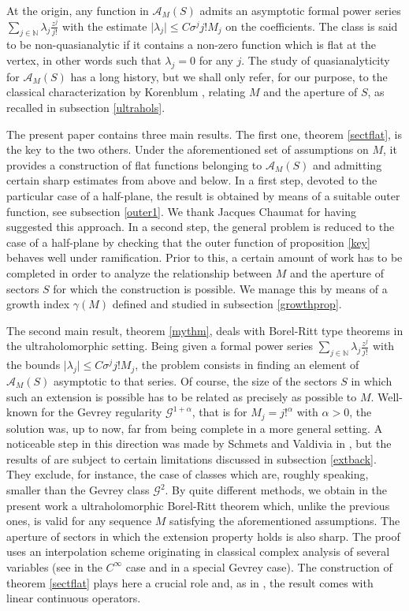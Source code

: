 \documentclass[a4paper]{amsart}
\theoremstyle{plain}
\theoremstyle{definition}
\theoremstyle{remark}
\begin{document}
At the origin, any function in $ \mathcal{A}_M(S) $ admits an asymptotic formal power series $ \sum_{j\in\mathbb{N}}\lambda_j\frac{z^j}{j!} $ with the estimate
$ \vert \lambda_j\vert\leq C\sigma^jj! M_j $ on the
coefficients. The class is said to be non-quasianalytic if it contains a non-zero function which is flat at the vertex, in other words such that $ \lambda_j=0 $ for any $ j $. The study of quasianalyticity for $ \mathcal{A}_M(S) $ has a long history, but we shall only refer, for our purpose, to the classical characterization by Korenblum \cite{Kor}, relating $ M $ and the aperture of $ S $, as recalled in subsection \ref{ultrahols}.

The present paper contains three main results. The first one, theorem \ref{sectflat}, is the key to the two others. Under the aforementioned set of assumptions on $ M $, it provides a construction of flat functions belonging to $ \mathcal{A}_M(S) $ and
admitting certain sharp estimates from above and below. In a first step, devoted to the particular case of a half-plane, the result is obtained by means of a suitable outer function, see subsection \ref{outer1}. We thank Jacques Chaumat for having suggested this
approach. In a second step, the general problem is reduced to the case of a half-plane by checking that the outer function of proposition \ref{key} behaves well
under ramification. Prior to this, a certain amount of work has to be completed in order to analyze the relationship
between $ M $ and the aperture of sectors $ S $ for which the construction is possible. We manage this by means of a growth index $ \gamma(M) $ defined and studied
in subsection \ref{growthprop}.

The second main result, theorem \ref{mythm}, deals with Borel-Ritt type theorems in the ultraholomorphic setting. Being given a formal power series $ \sum_{j\in\mathbb{N}}\lambda_j\frac{z^j}{j!} $ with 
the bounds $ \vert \lambda_j\vert\leq C\sigma^jj!M_j $, the problem consists in
finding an element of $ \mathcal{A}_M(S) $ asymptotic to that series.
Of course, the size of the sectors $ S $ in which such an extension is possible has to be related as precisely as possible to $ M $. Well-known \cite{Ra}\cite{Touglectures} for the Gevrey regularity $ \mathcal{G}^{1+\alpha} $, that is for
$ M_j=j!^\alpha $ with $ \alpha>0 $, the solution was, up to now, far from being complete in a more general setting. A noticeable step in this direction was made by Schmets and Valdivia in \cite{SV}, but the results of \cite{SV} are subject to certain limitations discussed in subsection \ref{extback}. They exclude, for instance, the case of classes which are, roughly speaking, smaller than the Gevrey class 
$ \mathcal{G}^2 $. By quite different methods, we obtain in the present work 
a ultraholomorphic Borel-Ritt theorem which, unlike the previous ones, is valid for any sequence $ M $ satisfying the aforementioned assumptions. The aperture of sectors in which the extension property holds is also sharp. The proof uses an interpolation scheme originating in classical complex analysis of several variables (see \cite{CC0} in the $ C^\infty $ case and \cite{CC1} in a special Gevrey case). The construction of theorem \ref{sectflat} plays here a crucial role and, as in \cite{SV}, the result comes with linear continuous operators. 
\end{document}
